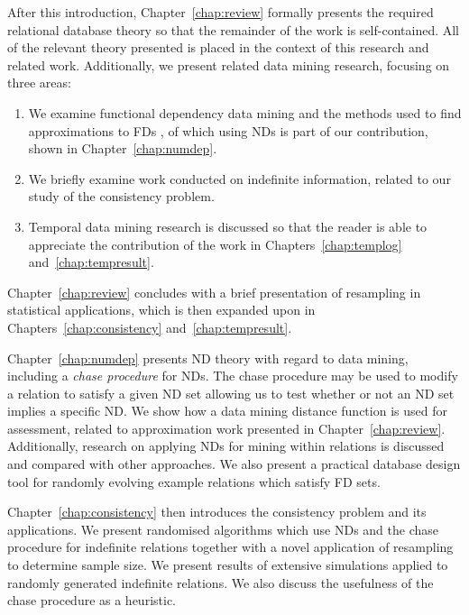 After this introduction, Chapter~\ref{chap:review} formally presents
the required relational database theory so that the remainder of the
work is self-contained.  All of the relevant theory presented is
placed in the context of this research and related work. Additionally,
we present related data mining research, focusing on three areas:
\begin{enumerate}
\item
We examine functional dependency data mining and the methods used to
find approximations to FDs \cite{km95,at94,Mann92,sf93,HS95,pk95,bel95b,psm93}, of which using NDs is part of our
contribution, shown in Chapter~\ref{chap:numdep}.
\item We briefly
examine work conducted on 
indefinite information, related to our study of the consistency
problem.
\item Temporal data mining research is discussed so that
the reader is able to appreciate the contribution of the
work in Chapters~\ref{chap:templog}
and~\ref{chap:tempresult}. 
\end{enumerate}
Chapter~\ref{chap:review} concludes with a
brief presentation of
resampling in statistical applications, which is then expanded upon in
Chapters~\ref{chap:consistency} and~\ref{chap:tempresult}.

\medskip

Chapter~\ref{chap:numdep} presents ND theory with regard to data
mining, including a {\em chase procedure} for NDs. The chase
procedure may be used to modify a relation to satisfy a given ND set
allowing us 
to test whether or not an ND set implies a specific ND.
We show how a
data mining distance function is used for assessment, related
to approximation work presented in
Chapter~\ref{chap:review}. Additionally, research on applying NDs for
mining within relations is discussed and compared with other
approaches. We also present a practical database design tool for randomly
evolving example relations which satisfy FD sets.

\medskip
Chapter~\ref{chap:consistency} then introduces
the consistency problem and its applications. We present randomised
algorithms which use NDs and the chase procedure for indefinite
relations together with a novel application of resampling to determine
sample size. We present results of extensive simulations applied to
randomly generated indefinite relations. We also discuss the
usefulness of the chase procedure as a heuristic.

\medskip

